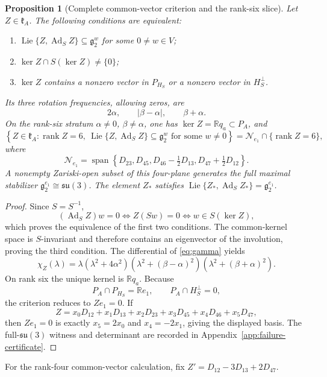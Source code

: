 \documentclass[11pt,a4paper]{article}
\newtheorem{proposition}[proposition]{Proposition}
\newcommand{\RR}{\mathbb R}
\newcommand{\gtwo}{\mathfrak g_2}
\newcommand{\Lie}{\operatorname{Lie}}
\newcommand{\Ad}{\operatorname{Ad}}
\newcommand{\Span}{\operatorname{span}}
\begin{document}
\begin{proposition}[Complete common-vector criterion and the rank-six slice]
\label{prop:failure}
Let $Z\in\mathfrak k_A$.  The following conditions are equivalent:
\begin{enumerate}[label=\textnormal{(\roman*)},leftmargin=9mm]
\item $\Lie\{Z,\Ad_SZ\}\subseteq\gtwo^w$ for some $0\ne w\in V$;
\item $\ker Z\cap S(\ker Z)\ne\{0\}$;
\item $\ker Z$ contains a nonzero vector in $P_{H_S}$ or a nonzero vector in $H_S^\perp$.
\end{enumerate}
Its three rotation frequencies, allowing zeros, are
\[
2\alpha,\qquad |\beta-\alpha|,\qquad \beta+\alpha.
\]
On the rank-six stratum $\alpha\ne0$, $\beta\ne\alpha$, one has $\ker Z=\RR q_a\subset P_A$, and
\[
\left\{Z\in\mathfrak k_A:\operatorname{rank}Z=6,
\ \Lie\{Z,\Ad_SZ\}\subseteq\gtwo^w\text{ for some }w\ne0\right\}
=\mathcal N_{e_1}\cap\{\operatorname{rank}Z=6\},
\]
where
\[
\mathcal N_{e_1}
=\Span\left\{D_{23},D_{45},D_{46}-\tfrac12D_{13},D_{47}+\tfrac12D_{12}\right\}.
\]
A nonempty Zariski-open subset of this four-plane generates the full maximal stabilizer $\gtwo^{e_1}\cong\mathfrak{su}(3)$.  The element $Z_*$ satisfies
$\Lie\{Z_*,\Ad_SZ_*\}=\mathfrak g_2^{e_1}$.
\end{proposition}

\begin{proof}
Since $S=S^{-1}$,
\[
(\Ad_SZ)w=0\iff Z(Sw)=0\iff w\in S(\ker Z),
\]
which proves the equivalence of the first two conditions.  The common-kernel space is $S$-invariant and therefore contains an eigenvector of the involution, proving the third condition.  The differential of \eqref{eq:gamma} yields
\[
\chi_Z(\lambda)=\lambda(\lambda^2+4\alpha^2)
(\lambda^2+(\beta-\alpha)^2)(\lambda^2+(\beta+\alpha)^2).
\]
On rank six the unique kernel is $\RR q_a$.  Because
\[
P_A\cap P_{H_S}=\RR e_1,
\qquad P_A\cap H_S^\perp=0,
\]
the criterion reduces to $Ze_1=0$.  If
\[
Z=x_0D_{12}+x_1D_{13}+x_2D_{23}+x_3D_{45}+x_4D_{46}+x_5D_{47},
\]
then $Ze_1=0$ is exactly $x_5=2x_0$ and $x_4=-2x_1$, giving the displayed basis.  The full-$\mathfrak{su}(3)$ witness and determinant are recorded in Appendix~\ref{app:failure-certificate}.
\end{proof}

For the rank-four common-vector calculation, fix
$Z'=D_{12}-3D_{13}+2D_{47}$.
\end{document}
